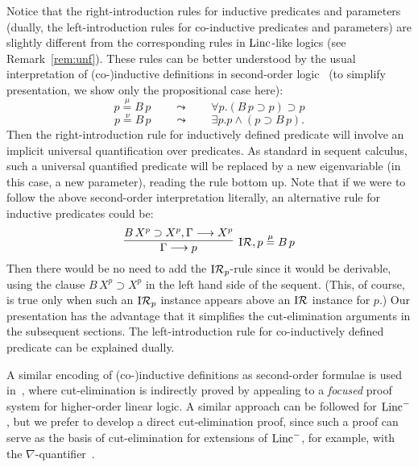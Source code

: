 \documentclass[preprint]{elsarticle}
\newcommand{\Linc}{{\rm Linc}^-}
\newcommand{\fLinc}{{\rm Linc}}
\newcommand{\Seq}[2]{#1\longrightarrow #2}
\newcommand{\defmu}{\stackrel{\mu}{=}}
\newcommand{\defnu}{\stackrel{\nu}{=}}
\newcommand{\indR}{{\rm I}{\cal R}}
\newcommand{\indRP}{{\rm I}{\cal R}_p}
\newcommand{\oimp}{\supset}
\begin{document}
Notice that the right-introduction rules for inductive predicates and
parameters (dually, the left-introduction rules for co-inductive
predicates and parameters) are slightly different from the
corresponding rules in $\fLinc$-like logics (see
Remark~\ref{rem:unf}).  These rules can be better understood by the
usual interpretation of (co-)inductive definitions in second-order
logic~\cite{Pfenning89mfps,Paulson97} (to simplify presentation, we
show only the propositional case here):
$$
p \defmu B\,p \qquad \leadsto \qquad \forall p. (B\,p \oimp p) \oimp p
$$
$$
p \defnu B\,p \qquad \leadsto \qquad \exists p. p \land (p \oimp
B\,p).
$$
Then the right-introduction rule for inductively defined predicate
will involve an implicit universal quantification over predicates.  As
standard in sequent calculus, such a universal quantified predicate
will be replaced by a new eigenvariable (in this case, a new
parameter), reading the rule bottom up.  Note that if we were to
follow the above second-order interpretation literally, an
alternative rule for inductive predicates could be:
$$
\infer[\indR, p \defmu B\,p] {\Seq{\Gamma}{p} } {\Seq{B\,X^p \oimp
    X^p, \Gamma}{X^p} }
$$
Then there would be no need to add the $\indRP$-rule since it would be
derivable, using the clause $B\,X^p \oimp X^p$ in the left hand side of
the sequent. (This, of course, is true only when such an $\indRP$
instance appears above an $\indR$ instance for $p$.)  Our presentation
has the advantage that it simplifies the cut-elimination arguments in
the subsequent sections.  The left-introduction rule for
co-inductively defined predicate can be explained dually.

A similar encoding of (co-)inductive definitions as second-order
formulae is used in~\cite{baelde07lpar}, where cut-elimination is
indirectly proved  by appealing to a \emph{focused} proof system for
higher-order linear logic. A similar approach can be followed for
$\Linc$, but we prefer to develop a direct cut-elimination proof,
since such a proof can serve as the basis of cut-elimination for
extensions of $\Linc$, for example, with the
$\nabla$-quantifier~\cite{miller05tocl,gacek08lics}.
\end{document}
